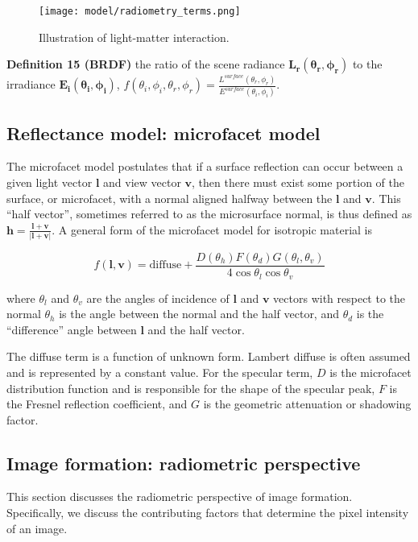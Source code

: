 \begin{figure}[!htbp]
\centering
\texttt{[image: model/radiometry\_terms.png]}
\caption{Illustration of light-matter interaction.}
\label{fig:radiometry_terms}
\end{figure}

\noindent\textbf{Definition 15 (BRDF)} the ratio of the scene radiance $\mathbf{L_r(\theta_r, \phi_r)}$ to the irradiance $\mathbf{E_i(\theta_i, \phi_i)}$, \ie $f(\theta_i, \phi_i, \theta_r, \phi_r)=\frac{L^{surface}(\theta_r, \phi_r)}{E^{surface}(\theta_i, \phi_i)}$.

\subsection{Reflectance model: microfacet model}
\label{sec:microfacet_model}
The microfacet model postulates that if a surface reflection can occur between a given light vector $\mathbf{l}$ and view vector $\mathbf{v}$, then there must exist some portion of the surface, or microfacet, with a normal aligned halfway between the $\mathbf{l}$ and $\mathbf{v}$. This ``half vector'', sometimes referred to as the microsurface normal, is thus defined as $\mathbf{h}=\frac{\mathbf{l}+\mathbf{v}}{|\mathbf{l}+\mathbf{v}|}$. A general form of the microfacet model for isotropic material is

$$
f(\mathbf{l}, \mathbf{v}) = \text{diffuse}+\frac{D(\theta_h)F(\theta_d)G(\theta_l, \theta_v)}{4\cos\theta_l\cos\theta_v}
$$

where $\theta_l$ and $\theta_v$ are the angles of incidence of $\mathbf{l}$ and $\mathbf{v}$ vectors with respect to the normal $\theta_h$ is the angle between the normal and the half vector, and $\theta_d$ is the ``difference'' angle between $\mathbf{l}$ and the half vector.

The diffuse term is a function of unknown form. Lambert diffuse is often assumed and is represented by a constant value. For the specular term, $D$ is the microfacet distribution function and is responsible for the shape of the specular peak, $F$ is the Fresnel reflection coefficient, and $G$ is the geometric attenuation or shadowing factor.

\subsection{Image formation: radiometric perspective}
This section discusses the radiometric perspective of image formation. Specifically, we discuss the contributing factors that determine the pixel intensity of an image.

